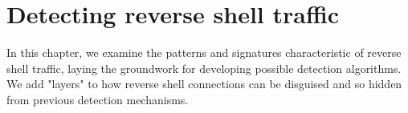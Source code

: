 \chapter{Detecting reverse shell traffic}

\label{chap:detection}

In this chapter, we examine the patterns and signatures characteristic of reverse shell traffic, laying the groundwork for developing possible detection algorithms. We add "layers" to how reverse shell connections can be disguised and so hidden from previous detection mechanisms.